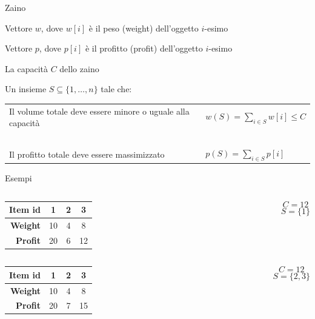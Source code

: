 \begin{frame}{Zaino}

\vspace{-9pt}
\begin{myboxtitle}[Input]
\BIL
\item Vettore $w$, dove \alert{$w[i]$} è il \alert{peso} (\alert{weight}) dell'oggetto $i$-esimo
\item Vettore $p$, dove \alert{$p[i]$} è il \alert{profitto} (\alert{profit}) dell'oggetto $i$-esimo
\item La \alert{capacità} $C$ dello zaino
\EIL
\end{myboxtitle}

\begin{myboxtitle}[Output]
Un insieme $S \subseteq \{1, \ldots, n\}$ tale che:

\medskip
\begin{tabular}{P{5cm}P{5cm}}
Il \alert{volume totale} deve essere minore o uguale alla capacità &

$w(S) = \sum_{i \in S} w[i] \leq C$
\\
~\\
Il \alert{profitto totale} deve essere massimizzato &
$
p(S) = \sum_{i \in S} p[i]
$
\\
\end{tabular}
\end{myboxtitle}

\end{frame}

\begin{frame}{Esempi}

\vspace{-9pt}

\begin{columns}[T]
\begin{tabular}{|r|c|c|c|}
\hline
\textbf{Item id} & \textbf{1} & \textbf{2} & \textbf{3} \\\hline
\textbf{Weight} & 10 & 4 & 8 \\\hline
\textbf{Profit} & 20 & 6 & 12 \\\hline 
\end{tabular} 
\[C=12\]
\pause
{}
\[S = \{1 \}\]
\end{columns}

\smallskip
{}

\pause
\smallskip
{}

\begin{columns}[T]
\begin{tabular}{|r|c|c|c|}
\hline
\textbf{Item id} & \textbf{1} & \textbf{2} & \textbf{3} \\\hline
\textbf{Weight} & 10 & 4 & 8 \\\hline
\textbf{Profit} & 20 & 7 & 15 \\\hline 
\end{tabular}
\[C=12\]
\pause
{}
\[S = \{ 2,3 \}\]
\end{columns}
\end{frame}

